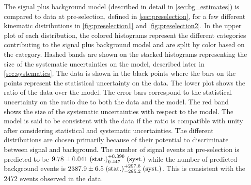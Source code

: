 The signal plus background model 
(described in detail in \sec\ref{sec:bg_estimates})
is compared to data at pre-selection, defined in \sec\ref{sec:preselection},
for a few different kinematic distributions 
in \fig\ref{fig:preselection1} and \fig\ref{fig:preselection2}. 
In the upper plot of each distribution,
the colored histograms 
represent the different categories contributing to the signal 
plus background model and 
are split by color based on the category. 
Hashed bands are shown on the stacked
histograms representing the size of the systematic uncertainties 
on the model, described later in \sec\ref{sec:systematics}.
The data is shown in the black points where the 
bars on the points represent the statistical uncertainty on the data.
The lower plot shows the ratio of the data over the model.
The error bars correspond to the statistical uncertainty
on the ratio due to both the data and the model. The red band
shows the size of the systematic uncertainties with respect to the model.
The model is said to be consistent with the data
if the ratio is compatible with unity after considering statistical
and systematic uncertainties.
The different distributions are chosen primarily because 
of their potential to discriminate between signal and background. 
The number of signal events at pre-selection is predicted to be 
$9.78 \pm 0.041 \mbox{$\;$(stat.)} ^{+0.390}_{0.447} \mbox{$\;$(syst.)}$
while the number of predicted background events is 
$2387.9 \pm 6.5 \mbox{$\;$(stat.)} ^{+297.8}_{-285.2} \mbox{$\;$(syst.)}$. 
This is consistent with the 2472 events observed in the data.




%



